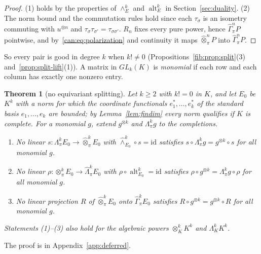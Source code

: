\documentclass[11pt]{amsart}
\newtheorem{theorem}{Theorem}[section]
\theoremstyle{definition}
\theoremstyle{remark}
\numberwithin{equation}{section}
\newcommand{\id}{\mathrm{id}}
\theoremstyle{plain}
\theoremstyle{definition}
\theoremstyle{plain}
\begin{document}
\begin{proof}
(1) holds by the properties of $\wedge^k_E$ and $\operatorname{alt}^k_E$ in Section~\ref{sec:duality}.
(2) The norm bound and the commutation rules hold since each $\tau_\sigma$ is an isometry commuting with $u^{\otimes n}$
and $\tau_\sigma\tau_{\sigma'}=\tau_{\sigma\sigma'}$. $R_n$ fixes every pure power, hence $\widehat\Gamma^n_\pi P$
pointwise, and by~\eqref{can:eq:polarization} and continuity it maps $\widehat\otimes^n_\pi P$ into
$\widehat\Gamma^n_\pi P$.
\end{proof}

So every pair is good in degree $k$ when $k!\ne0$ (Propositions~\ref{fib:prop:split}(3) and~\ref{prop:split-lift}(1)).
A matrix in $GL_k(K)$ is \emph{monomial} if each row and each column has exactly one nonzero entry.

\begin{theorem}[no equivariant splitting]\label{can:thm:monomial}
Let $k\ge2$ with $k!=0$ in $K$, and let $E_0$ be $K^k$ with a norm for which the coordinate functionals
$e^*_1,\dots,e^*_k$ of the standard basis $e_1,\dots,e_k$ are bounded; by Lemma~\ref{lem:findim} every norm
qualifies if $K$ is complete. For a monomial $g$, extend $g^{\otimes k}$ and $\Lambda^k_\pi g$ to the completions.
\begin{enumerate}
\item No linear $s\colon\Lambda^k_\pi E_0\to\widehat\otimes^k_\pi E_0$ with $\widehat\wedge^k_{E_0}\circ s=\id$ satisfies
$s\circ\Lambda^k_\pi g=g^{\otimes k}\circ s$ for all monomial $g$.
\item No linear $\rho\colon\otimes^k_\pi E_0\to\widehat\Lambda^k_\pi E_0$ with $\rho\circ\operatorname{alt}^k_{E_0}=\id$
satisfies $\rho\circ g^{\otimes k}=\Lambda^k_\pi g\circ\rho$ for all monomial $g$.
\item No linear projection $R$ of $\widehat\otimes^k_\pi E_0$ onto $\widehat\Gamma^k_\pi E_0$ satisfies
$R\circ g^{\otimes k}=g^{\otimes k}\circ R$ for all monomial $g$.
\end{enumerate}
Statements (1)--(3) also hold for the algebraic powers $\otimes^k_KK^k$ and $\Lambda^k_KK^k$.
\end{theorem}

The proof is in Appendix~\ref{app:deferred}.
\end{document}
